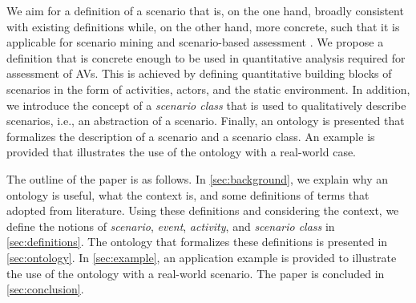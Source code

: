 We aim for a definition of a scenario that is, on the one hand, broadly consistent with existing definitions \cite{geyer2014, ulbrich2015, elrofai2016scenario} while, on the other hand, more concrete, such that it is applicable for scenario mining \cite{elrofai2016scenario} and scenario-based assessment \cite{stellet2015taxonomy, deGelder2017assessment}. We propose a definition that is concrete enough to be used in quantitative analysis required for assessment of AVs. This is achieved by defining quantitative building blocks of scenarios in the form of activities, actors, and the static environment. In addition, we introduce the concept of a \emph{scenario class} that is used to qualitatively describe scenarios, i.e., an abstraction of a scenario. Finally, an ontology is presented that formalizes the description of a scenario and a scenario class. 
An example is provided that illustrates the use of the ontology with a real-world case.


The outline of the paper is as follows. In \cref{sec:background}, we explain why an ontology is useful, what the context is, and some definitions of terms that adopted from literature. 
Using these definitions and considering the context, we define the notions of \emph{scenario}, \emph{event}, \emph{activity}, and \emph{scenario class} in \cref{sec:definitions}. 
The ontology that formalizes these definitions is presented in \cref{sec:ontology}. 
In \cref{sec:example}, an application example is provided to illustrate the use of the ontology with a real-world scenario. 
The paper is concluded in \cref{sec:conclusion}.
